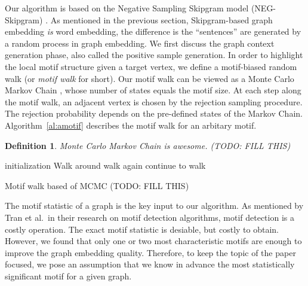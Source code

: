 \documentclass[letterpaper]{article}
\newtheorem{ntdef}{Definition}
\begin{document}
            Our algorithm is based on the Negative Sampling Skipgram model (NEG-Skipgram) \cite{skipgram}.
            As mentioned in the previous section, Skipgram-based graph embedding \emph{is} word embedding,
            the difference is the ``sentences'' are generated by a random process in graph embedding.
            We first discuss the graph context generation phase, also called the positive sample generation.
            In order to highlight the local motif structure given a target vertex, we define a motif-biased
            random walk (or \emph{motif walk} for short). Our motif walk can be viewed as a Monte Carlo
            Markov Chain \cite{mcmc}, whose number of states equals the motif size. At each step along 
            the motif walk, an adjacent vertex is chosen by the rejection sampling procedure. The rejection
            probability depends on the pre-defined states of the Markov Chain. Algorithm~\ref{al:amotif} 
            describes the motif walk for an arbitary motif.

            \begin{ntdef}
                Monte Carlo Markov Chain is awesome. (TODO: FILL THIS)
            \end{ntdef}



            \begin{algorithm}
                \DontPrintSemicolon
                initialization\;
                 {
                    Walk around\;
                     {
                        walk again\;
                    } {
                        continue to walk\;
                    }
                }
                \caption{Motif walk based of MCMC (TODO: FILL THIS)}
                \label{al:amotif}
            \end{algorithm}

            The motif statistic of a graph is the key input to our algorithm. As mentioned by Tran et al.\ in
            their research on motif detection algorithms, motif detection is a costly operation. The
            exact motif statistic is desiable, but costly to obtain. However, we found that only one or 
            two most characteristic motifs are enough to improve the graph embedding quality. Therefore, 
            to keep the topic of the paper focused, we pose an assumption that we know in advance the most
            statistically significant motif for a given graph. 
\end{document}
